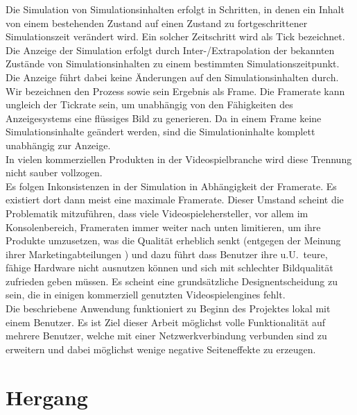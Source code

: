 \documentclass[11pt,twoside,a4paper]{article}
\begin{document}
Die Simulation von Simulationsinhalten erfolgt in Schritten, in denen ein Inhalt von einem bestehenden Zustand auf einen Zustand zu fortgeschrittener Simulationszeit verändert wird. Ein solcher Zeitschritt wird als Tick bezeichnet.\\
Die Anzeige der Simulation erfolgt durch Inter-/Extrapolation der bekannten Zustände von Simulationsinhalten zu einem bestimmten Simulationszeitpunkt. Die Anzeige führt dabei keine Änderungen auf den Simulationsinhalten durch. Wir bezeichnen den Prozess sowie sein Ergebnis als Frame.
Die Framerate kann ungleich der Tickrate sein, um unabhängig von den Fähigkeiten des Anzeigesystems eine flüssiges Bild zu generieren. Da in einem Frame keine Simulationsinhalte geändert werden, sind die Simulationinhalte komplett unabhängig zur Anzeige.\\

In vielen kommerziellen Produkten in der Videospielbranche wird diese Trennung nicht sauber vollzogen.\\
Es folgen Inkonsistenzen in der Simulation in Abhängigkeit der Framerate.
Es existiert dort dann meist eine maximale Framerate.
Dieser Umstand scheint die Problematik mitzuführen, dass viele Videospielehersteller, vor allem im Konsolenbereich, Frameraten immer weiter nach unten limitieren, um ihre Produkte umzusetzen, was die Qualität erheblich senkt 
(entgegen der Meinung ihrer Marketingabteilungen
) und dazu führt dass Benutzer ihre u.U.~teure, fähige Hardware nicht ausnutzen können und sich mit schlechter Bildqualität zufrieden geben müssen.
Es scheint eine grundsätzliche Designentscheidung zu sein, die in einigen kommerziell genutzten Videospielengines fehlt.\\

Die beschriebene Anwendung funktioniert zu Beginn des Projektes lokal mit einem Benutzer. Es ist Ziel dieser Arbeit möglichst volle Funktionalität auf mehrere Benutzer, welche mit einer Netzwerkverbindung verbunden sind zu erweitern und dabei möglichst wenige negative Seiteneffekte zu erzeugen.

\section{Hergang}

\end{document}
